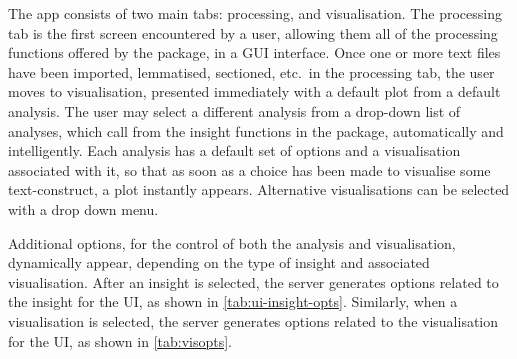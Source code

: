 \documentclass[11pt, a4paper, titlepage]{report}
\begin{document}
The app consists of two main tabs: processing, and visualisation. The
processing tab is the first screen encountered by a user, allowing
them all of the processing functions offered by the package, in a GUI
interface. Once one or more text files have been imported, lemmatised,
sectioned, etc.\ in the processing tab, the user moves to
visualisation, presented immediately with a default plot from a
default analysis. The user may select a different analysis from a
drop-down list of analyses, which call from the insight functions in
the package, automatically and intelligently. Each analysis has a
default set of options and a visualisation associated with it, so that
as soon as a choice has been made to visualise some text-construct, a
plot instantly appears. Alternative visualisations can be selected
with a drop down menu.

Additional options, for the control of both the analysis and
visualisation, dynamically appear, depending on the type of insight
and associated visualisation. After an insight is selected, the server
generates options related to the insight for the UI, as shown in
\cref{tab:ui-insight-opts}. Similarly, when a visualisation is
selected, the server generates options related to the visualisation
for the UI, as shown in \cref{tab:visopts}.
\end{document}
